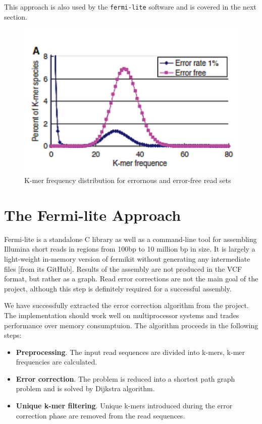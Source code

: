 This approach is also used by the \texttt{fermi-lite} software and is covered in the next section.

\begin{figure}[h]
	\centering
	\includegraphics{img/kmer-frequency-distribution.pdf}
	\caption{K-mer frequency distribution for errornous and error-free read sets}
	\label{fig:kmer-frequency-distribution}
\end{figure}

\section{The Fermi-lite Approach}
\label{sec:fermi-lite}

Fermi-lite is a standalone C library as well as a command-line tool for assembling Illumina short reads in regions from 100bp to 10 million bp in size. It is largely a light-weight in-memory version of fermikit without generating any intermediate files [from its GitHub]. Results of the assembly are not produced in the VCF format, but rather as a graph. Read error corrections are not the main goal of the project, although this step is definitely required for a successful assembly.

We have successfully extracted the error correction algorithm from the project. The implementation should work well on multiprocessor systems and trades performance over memory consumptuion. The algorithm proceeds in the following steps:
\begin{itemize}
\item \textbf{Preprocessing}. The input read sequences are divided into k-mers, k-mer frequencies are calculated.
\item \textbf{Error correction}. The problem is reduced into a shortest path graph problem and is solved by Dijkstra algorithm.
\item \textbf{Unique k-mer filtering}. Unique k-mers introduced during the error correction phase are removed from the read sequences.
\end{itemize}
 
